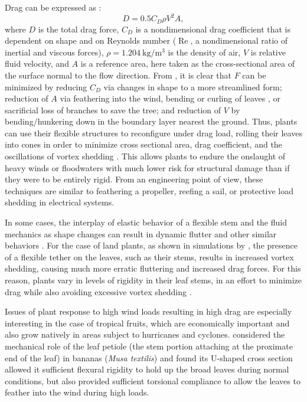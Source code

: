 Drag can be expressed as \citep{kundu2012fluid}:
\begin{equation}
D=0.5 C_D \rho V^2 A,
\label{eq:drag}
\end{equation}
where $D$ is the total drag force, $C_D$ is a nondimensional drag coefficient that is dependent on shape and on Reynolds number ($\operatorname{Re}$, a nondimensional ratio of inertial and viscous forces), $\rho=\SI{1.204}{\kilo\gram\per\meter\cubed}$ is the density of air, $V$ is relative fluid velocity, and $A$ is a reference area, here taken as the cross-sectional area of the surface normal to the flow direction. From , it is clear that $F$ can be minimized by reducing $C_D$ via changes in shape to a more streamlined form; reduction of $A$ via feathering into the wind, bending or curling of leaves \citep{ennos2000functional}, or sacrificial loss of branches to save the tree; and reduction of $V$ by bending/hunkering down in the boundary layer nearest the ground. Thus, plants can use their flexible structures to reconfigure under drag load, rolling their leaves into cones in order to minimize cross sectional area, drag coefficient, and the oscillations of vortex shedding \citep{miller2012reconfiguration, vogel1989drag, ennos2000functional}. This allows plants to endure the onslaught of heavy winds or floodwaters with much lower risk for structural damage than if they were to be entirely rigid. From an engineering point of view, these techniques are similar to feathering a propeller, reefing a sail, or protective load shedding in electrical systems.

In some cases, the interplay of elastic behavior of a flexible stem and the fluid mechanics as shape changes can result in dynamic flutter and other similar behaviors \citep{miller2012reconfiguration, boller2007interspecific, denny2002mechanics}. For the case of land plants, as shown in simulations by \citet{miller2012reconfiguration}, the presence of a flexible tether on the leaves, such as their stems, results in increased vortex shedding, causing much more erratic fluttering and increased drag forces. For this reason, plants vary in levels of rigidity in their leaf stems, in an effort to minimize drag while also avoiding excessive vortex shedding \citep{miller2012reconfiguration, vogel2009leaves}. 
    
Issues of plant response to high wind loads resulting in high drag are especially interesting in the case of tropical fruits, which are economically important and also grow natively in areas subject to hurricanes and cyclones. \citet{ennos2000functional} considered the mechanical role of the leaf petiole (the stem portion attaching at the proximate end of the leaf) in bananas (\emph{Musa textilis}) and found its U-shaped cross section allowed it sufficient flexural rigidity to hold up the broad leaves during normal conditions, but also provided sufficient torsional compliance to allow the leaves to feather into the wind during high loads. 
    
